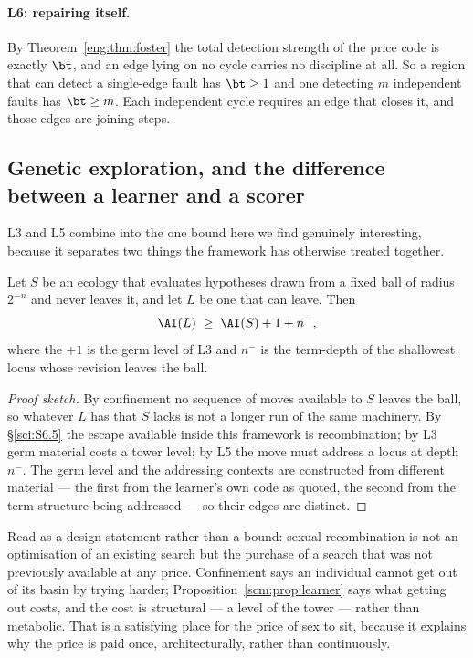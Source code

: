 \paragraph{L6: repairing itself.}
By Theorem~\ref{eng:thm:foster} the total detection strength of the price
code is exactly $\bt$, and an edge lying on no cycle carries no discipline
at all. So a region that can detect a single-edge fault has $\bt \ge 1$
and one detecting $m$ independent faults has $\bt \ge m$. Each independent
cycle requires an edge that closes it, and those edges are joining steps.

\subsection{Genetic exploration, and the difference between a learner and
a scorer}
\label{scm:sec:learner}

L3 and L5 combine into the one bound here we find genuinely interesting,
because it separates two things the framework has otherwise treated
together.

\begin{proposition}
\label{scm:prop:learner}
Let $S$ be an ecology that evaluates hypotheses drawn from a fixed ball of
radius $2^{-n}$ and never leaves it, and let $L$ be one that can leave.
Then
\[
  \AI(L) \;\ge\; \AI(S) + 1 + n^{-},
\]
where the $+1$ is the germ level of L3 and $n^{-}$ is the term-depth of
the shallowest locus whose revision leaves the ball.
\end{proposition}

\begin{proof}[Proof sketch]
By confinement no sequence of moves available to $S$ leaves the ball, so
whatever $L$ has that $S$ lacks is not a longer run of the same machinery.
By \S\ref{sci:S6.5} the escape available inside this framework is
recombination; by L3 germ material costs a tower level; by L5 the move
must address a locus at depth $n^{-}$. The germ level and the addressing
contexts are constructed from different material --- the first from the
learner's own code as quoted, the second from the term structure being
addressed --- so their edges are distinct.
\end{proof}

\begin{remark}
\label{scm:rmk:genetic}
Read as a design statement rather than a bound: sexual recombination is
not an optimisation of an existing search but the purchase of a search
that was not previously available at any price. Confinement says an
individual cannot get out of its basin by trying harder;
Proposition~\ref{scm:prop:learner} says what getting out costs, and the
cost is structural --- a level of the tower --- rather than metabolic.
That is a satisfying place for the price of sex to sit, because it
explains why the price is paid once, architecturally, rather than
continuously.
\end{remark}

